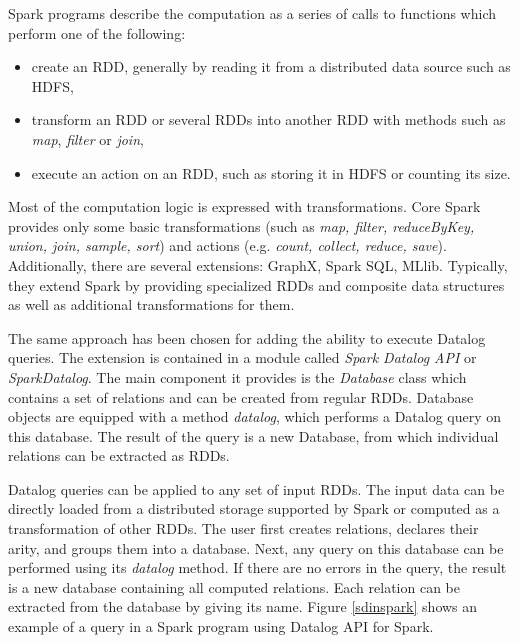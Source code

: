 Spark programs describe the computation as a series of calls to functions which perform one of the following:
\begin{itemize}
  \item create an RDD, generally by reading it from a distributed data source such as HDFS,
  \item transform an RDD or several RDDs into another RDD with methods such as \emph{map}, \emph{filter} or \emph{join},
  \item execute an action on an RDD, such as storing it in HDFS or counting its size.
\end{itemize}

Most of the computation logic is expressed with transformations.  Core Spark provides only some basic transformations (such as \emph{map, filter, reduceByKey, union, join, sample, sort}) and actions (e.g. \emph{count, collect, reduce, save}). Additionally, there are several extensions: GraphX, Spark SQL, MLlib. Typically, they extend Spark by providing specialized RDDs and composite data structures as well as additional transformations for them.

The same approach has been chosen for adding the ability to execute Datalog queries. The extension is contained in a module called \emph{Spark Datalog API} or \emph{SparkDatalog}. The main component it provides is the \emph{Database} class which contains a set of relations and can be created from regular RDDs. Database objects are equipped with a method \emph{datalog}, which performs a Datalog query on this database. The result of the query is a new Database, from which individual relations can be extracted as RDDs. 

Datalog queries can be applied to any set of input RDDs. The input data can be directly loaded from a distributed storage supported by Spark or computed as a transformation of other RDDs. The user first creates relations, declares their arity, and groups them into a database. Next, any query on this database can be performed using its \emph{datalog} method. If there are no errors in the query, the result is a new database containing all computed relations. Each relation can be extracted from the database by giving its name. Figure \ref{sdinspark} shows an example of a \datalogra query in a Spark program using Datalog API for Spark.

